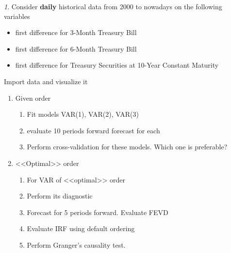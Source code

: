 \documentclass[12pt]{article}
\theoremstyle{remark}
\newtheorem{exercise}{}[section]
\begin{document}
\begin{exercise}
Consider \textbf{daily} historical data from 2000 to nowadays on the following variables
\begin{itemize}
	\item first difference for 3-Month Treasury Bill
	\item first difference for 6-Month Treasury Bill
	\item first difference for Treasury Securities at 10-Year Constant Maturity
\end{itemize}
Import data and visualize it
\begin{enumerate}
	\item Given order
	\begin{enumerate}
		\item Fit models VAR(1), VAR(2), VAR(3)
		\item evaluate 10 periods forward forecast for each 
		\item Perform cross-validation for these models. Which one is preferable?
	\end{enumerate}
	\item <<Optimal>> order
	\begin{enumerate}
		\item For VAR of <<optimal>> order
		\item Perform its diagnostic
		\item Forecast for 5 periods forward. Evaluate FEVD
		\item Evaluate IRF using default ordering
		\item Perform Granger's causality test.
	\end{enumerate}
\end{enumerate}
\end{exercise}
	
\end{document}
